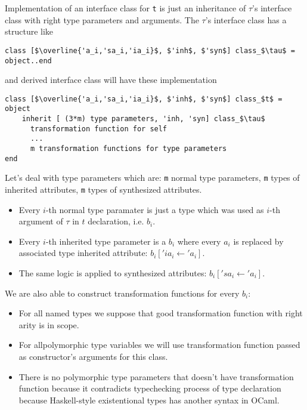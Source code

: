\documentclass[acmsmall,review,anonymous]{acmart}\settopmatter{printfolios=true,printccs=false,printacmref=false}
\begin{document}
Implementation of an interface class for \lstinline{t} is just an inheritance of  $\tau$'s interface class with right type parameters and arguments. The $\tau$'s interface class has a structure like
\begin{lstlisting}
class [$\overline{'a_i,'sa_i,'ia_i}$, $'inh$, $'syn$] class_$\tau$ = object..end
\end{lstlisting}
and derived interface class will have these implementation
\begin{lstlisting}
class [$\overline{'a_i,'sa_i,'ia_i}$, $'inh$, $'syn$] class_$t$ = object
    inherit [ (3*m) type parameters, 'inh, 'syn] class_$\tau$ 
      transformation function for self
      ...
      m transformation functions for type parameters
end
\end{lstlisting}
Let's deal with type parameters which are: \lstinline{m} normal type parameters, \lstinline{m} types of inherited attributes, \lstinline{m} types of synthesized attributes. 
\begin{itemize}
 \item Every $i$-th normal type paramater is just a type which was used as $i$-th argument of $\tau$ in $t$ declaration, i.e. $b_i$.
 \item Every $i$-th inherited type parameter is a $b_i$ where every $a_i$ is replaced by associated type inherited attribute:  $b_i['ia_i \gets \!'a_i]$.
 \item The same logic is applied to synthesized attributes: $b_i['sa_i \gets \!'a_i]$.
\end{itemize}
We are also able to construct transformation functions for every $b_i$: 
\begin{itemize}
 \item For all named types we suppose that good transformation function with right arity is in scope.
 \item For allpolymorphic type variables we will use transformation function passed as constructor's arguments for this class.
 \item There is no polymorphic type parameters that doesn't have transformation function because it contradicts typechecking process of type declaration because Haskell-style existentional types has another syntax in OCaml.
\end{itemize}
\end{document}
